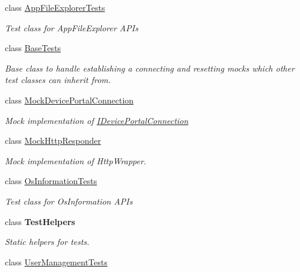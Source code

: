 \begin{DoxyCompactItemize}
\item 
class \hyperlink{class_microsoft_1_1_tools_1_1_windows_device_portal_1_1_tests_1_1_app_file_explorer_tests}{App\+File\+Explorer\+Tests}
\begin{DoxyCompactList}\small\item\em Test class for App\+File\+Explorer A\+P\+Is \end{DoxyCompactList}\item 
class \hyperlink{class_microsoft_1_1_tools_1_1_windows_device_portal_1_1_tests_1_1_base_tests}{Base\+Tests}
\begin{DoxyCompactList}\small\item\em Base class to handle establishing a connecting and resetting mocks which other test classes can inherit from. \end{DoxyCompactList}\item 
class \hyperlink{class_microsoft_1_1_tools_1_1_windows_device_portal_1_1_tests_1_1_mock_device_portal_connection}{Mock\+Device\+Portal\+Connection}
\begin{DoxyCompactList}\small\item\em Mock implementation of \hyperlink{interface_microsoft_1_1_tools_1_1_windows_device_portal_1_1_i_device_portal_connection}{I\+Device\+Portal\+Connection} \end{DoxyCompactList}\item 
class \hyperlink{class_microsoft_1_1_tools_1_1_windows_device_portal_1_1_tests_1_1_mock_http_responder}{Mock\+Http\+Responder}
\begin{DoxyCompactList}\small\item\em Mock implementation of Http\+Wrapper. \end{DoxyCompactList}\item 
class \hyperlink{class_microsoft_1_1_tools_1_1_windows_device_portal_1_1_tests_1_1_os_information_tests}{Os\+Information\+Tests}
\begin{DoxyCompactList}\small\item\em Test class for Os\+Information A\+P\+Is \end{DoxyCompactList}\item 
class {\bfseries Test\+Helpers}
\begin{DoxyCompactList}\small\item\em Static helpers for tests. \end{DoxyCompactList}\item 
class \hyperlink{class_microsoft_1_1_tools_1_1_windows_device_portal_1_1_tests_1_1_user_management_tests}{User\+Management\+Tests}

\end{DoxyCompactItemize}
